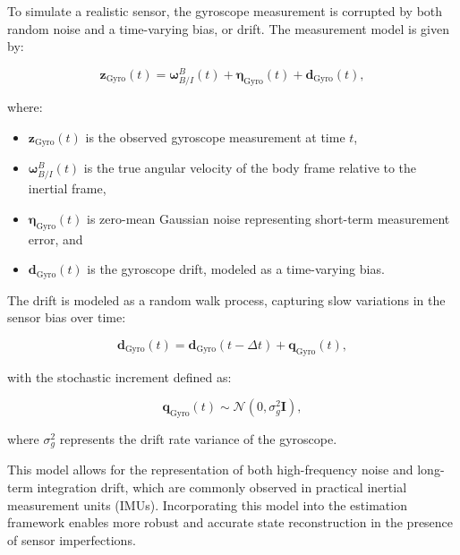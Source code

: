 To simulate a realistic sensor, the gyroscope measurement is corrupted by both random noise and a time-varying bias, or drift. The measurement model is given by:

\begin{equation}
    \mathbf{z}_{\text{Gyro}}(t) = \boldsymbol{\omega}^B_{B/I}(t) + \boldsymbol{\eta}_{\text{Gyro}}(t) + \mathbf{d}_{\text{Gyro}}(t),
\end{equation}

where:
\begin{itemize}
    \item $\mathbf{z}_{\text{Gyro}}(t)$ is the observed gyroscope measurement at time $t$,
    \item $\boldsymbol{\omega}^B_{B/I}(t)$ is the true angular velocity of the body frame relative to the inertial frame,
    \item $\boldsymbol{\eta}_{\text{Gyro}}(t)$ is zero-mean Gaussian noise representing short-term measurement error, and
    \item $\mathbf{d}_{\text{Gyro}}(t)$ is the gyroscope drift, modeled as a time-varying bias.
\end{itemize}

The drift is modeled as a random walk process, capturing slow variations in the sensor bias over time:

\begin{equation}
    \mathbf{d}_{\text{Gyro}}(t) = \mathbf{d}_{\text{Gyro}}(t - \Delta t) + \mathbf{q}_{\text{Gyro}}(t),
\end{equation}

with the stochastic increment defined as:

\begin{equation}
    \mathbf{q}_{\text{Gyro}}(t) \sim \mathcal{N}(0, \sigma_g^2 \mathbf{I}),
\end{equation}

where $\sigma_g^2$ represents the drift rate variance of the gyroscope.

This model allows for the representation of both high-frequency noise and long-term integration drift, which are commonly observed in practical inertial measurement units (IMUs). Incorporating this model into the estimation framework enables more robust and accurate state reconstruction in the presence of sensor imperfections.










\label{sec:modconclusion}